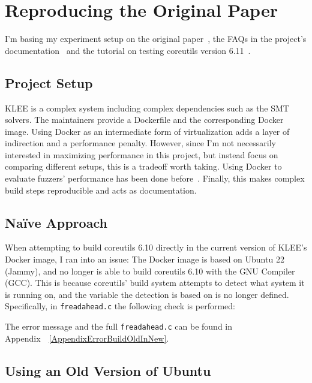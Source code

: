 \documentclass{article}
\let\savedCite=\cite
\renewcommand{\cite}{\unskip~\savedCite}
\let\savedRef=\ref
\renewcommand{\ref}{\unskip~\savedRef}
\begin{document}
\section{Reproducing the Original Paper}
\label{Reproducing}
I'm basing my experiment setup on the original paper\cite{KLEE}, the FAQs in the project's documentation\cite{KLEEFAQ} and the tutorial on testing coreutils version 6.11\cite{KLEETutorial}.

\subsection{Project Setup}
\label{ProjectSetup}
KLEE is a complex system including complex dependencies such as the SMT solvers. The maintainers provide a Dockerfile and the corresponding Docker image. Using Docker as an intermediate form of virtualization adds a layer of indirection and a performance penalty. However, since I'm not necessarily interested in maximizing performance in this project, but instead focus on comparing different setups, this is a tradeoff worth taking. Using Docker to evaluate fuzzers' performance has been done before\cite{UNIFUZZ}. Finally, this makes complex build steps reproducible and acts as documentation.

\subsection{Naïve Approach}

When attempting to build coreutils 6.10 directly in the current version of KLEE's Docker image, I ran into an issue: The Docker image is based on Ubuntu 22 (Jammy), and no longer is able to build coreutils 6.10 with the GNU Compiler (GCC). This is because coreutils' build system attempts to detect what system it is running on, and the variable the detection is based on is no longer defined. Specifically, in \lstinline{freadahead.c} the following check is performed:



The error message and the full \lstinline{freadahead.c} can be found in Appendix~\ref{AppendixErrorBuildOldInNew}.

\subsection{Using an Old Version of Ubuntu}
\label{OldVersion}
\end{document}
